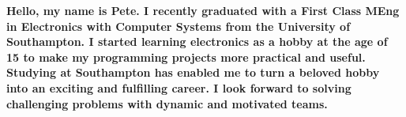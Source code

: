 \begin{center}
  \begin{minipage}{170mm}
    \centering
    \bfseries
    Hello, my name is Pete.
    I recently graduated with a First Class MEng in Electronics with Computer Systems from the University of Southampton.
    I started learning electronics as a hobby at the age of 15 to make my programming projects more practical and useful. 
    Studying at Southampton has enabled me to turn a beloved hobby into an exciting and fulfilling career.
    I look forward to solving challenging problems with dynamic and motivated teams.
  \end{minipage}

\end{center}
